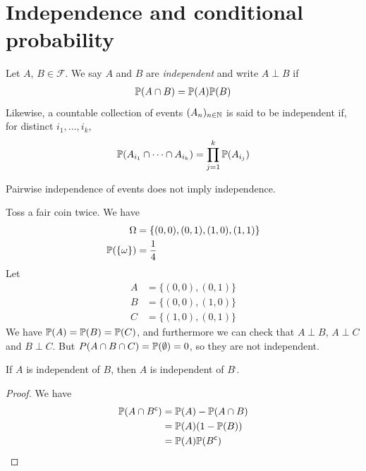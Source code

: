 \documentclass{../../template/note}
\begin{document}
    \section{Independence and conditional probability}
    
    \begin{definition}[Independence]
        Let \(A\), \(B \in \mathcal F\). We say \(A\) and \(B\) are \emph{independent} and write \(A \perp B\) if
        \begin{align*}
            \mathbb P(A \cap B) = \mathbb P(A) \mathbb P(B)
        \end{align*}
        Likewise, a countable collection of events \((A_n)_{n \in \mathbb N}\) is said to be independent if, for distinct \(i_1, \dots, i_k\),
        \begin{align*}
            \mathbb P(A_{i_1} \cap \dots \cap A_{i_k}) = \prod_{j=1}^k \mathbb P(A_{i_j})
        \end{align*}
    \end{definition}
    
    \begin{remark*}
        Pairwise independence of events does not imply independence.
    \end{remark*}
    
    \begin{example*}
        Toss a fair coin twice. We have
        \begin{align*}
            \Omega &= \{(0, 0), (0, 1), (1, 0), (1, 1)\} \\
            \mathbb P(\{\omega\}) &= \frac 1 4
        \end{align*}
        Let
        \begin{align*}
            A &= \{(0, 0), (0, 1)\} \\
            B &= \{(0, 0), (1, 0)\} \\
            C &= \{(1, 0), (0, 1)\}
        \end{align*}
        We have \(\mathbb P(A) = \mathbb P(B) = \mathbb P(C)\), and furthermore we can check that \(A \perp B\), \(A \perp C\) and \(B \perp C\). But \(\\P(A \cap B \cap C) = \mathbb P(\emptyset) = 0\), so they are not independent.
    \end{example*}
    
    \begin{proposition}
        If \(A\) is independent of \(B\), then \(A\) is independent of \(B^\comp\).
    \end{proposition}
    
    \begin{proof}
        We have
        \begin{align*}
            \mathbb P(A \cap B^{\mathsf{c}}) &= \mathbb P(A) - \mathbb P(A \cap B) \\
            &= \mathbb P(A)(1 - \mathbb P(B)) \\
            &= \mathbb P(A)\mathbb P(B^{\mathsf{c}})
        \end{align*}
    \end{proof}
    
\end{document}
